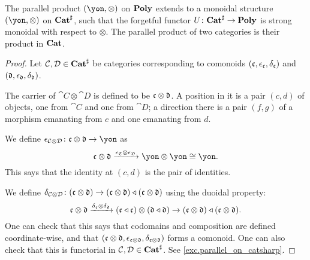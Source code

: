 \documentclass[Book-Poly]{subfiles}
\begin{document}
\begin{proposition}\label{prop.parallel_on_catsharp}
The parallel product $(\yon,\otimes)$ on $\mathbf{Poly}$ extends to a monoidal structure $(\yon,\otimes)$ on $\mathbf{Cat}^\sharp$, such that the forgetful functor
$U\colon\mathbf{Cat}^\sharp\to\mathbf{Poly}$
is strong monoidal with respect to $\otimes$.
The parallel product of two categories is their product in $\mathbf{Cat}$.
\end{proposition}
\begin{proof}
Let $\mathcal{C},\mathcal{D}\in\mathbf{Cat}^\sharp$ be categories corresponding to comonoids $(\mathfrak{c},\epsilon_{\mathfrak{c}},\delta_{\mathfrak{c}})$ and $(\mathfrak{d},\epsilon_{\mathfrak{d}},\delta_{\mathfrak{d}})$.



The carrier of $\cat{C}\otimes\cat{D}$ is defined to be $\mathfrak{c}\otimes\mathfrak{d}$. A position in it is a pair $(c,d)$ of objects, one from $\cat{C}$ and one from $\cat{D}$; a direction there is a pair $(f,g)$ of a morphism emanating from $c$ and one emanating from $d$.

We define $\epsilon_{\cat{C}\otimes\cat{D}}\colon\car{c}\otimes\car{d}\to\yon$ as
\[
\car{c}\otimes\car{d}\To{\epsilon_{\car{C}}\otimes\epsilon_{\car{D}}}\yon\otimes\yon\cong\yon.
\]
This says that the identity at $(c,d)$ is the pair of identities.

We define $\delta_{\mathcal{C}\otimes\mathcal{D}}\colon(\mathfrak{c}\otimes\mathfrak{d})\to(\mathfrak{c}\otimes\mathfrak{d})\mathbin{\triangleleft}(\mathfrak{c}\otimes\mathfrak{d})$ using the duoidal property:
\[
\mathfrak{c}\otimes\mathfrak{d}\xrightarrow{\delta_{\mathfrak{c}}\otimes\delta_{\mathfrak{d}}}(\mathfrak{c}\mathbin{\triangleleft}\mathfrak{c})\otimes(\mathfrak{d}\mathbin{\triangleleft}\mathfrak{d})\to(\mathfrak{c}\otimes\mathfrak{d})\mathbin{\triangleleft}(\mathfrak{c}\otimes\mathfrak{d}).
\]
One can check that this says that codomains and composition are defined coordinate-wise, and that $(\mathfrak{c}\otimes\mathfrak{d},\epsilon_{\mathfrak{c}\otimes\mathfrak{d}},\delta_{\mathfrak{c}\otimes\mathfrak{d}})$ forms a comonoid. One can also check that this is functorial in $\mathcal{C},\mathcal{D}\in\mathbf{Cat}^\sharp$. See \cref{exc.parallel_on_catsharp}.
\end{proof}
\end{document}
